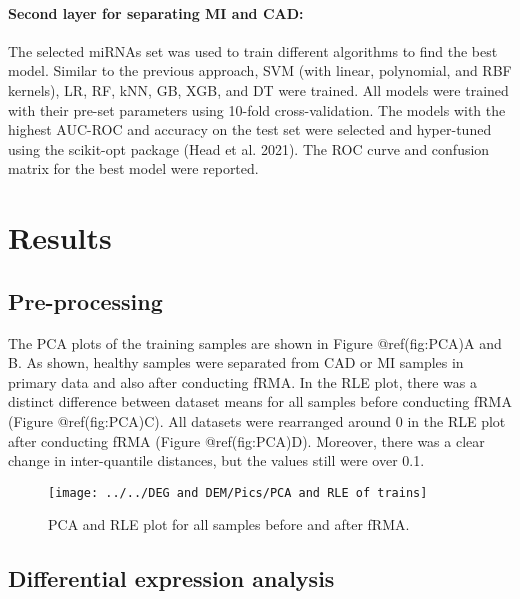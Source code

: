 \documentclass[smallextended]{svjour3}       %
\begin{document}
\hypertarget{second-layer-for-separating-mi-and-cad}{%
\paragraph{Second layer for separating MI and
CAD:}\label{second-layer-for-separating-mi-and-cad}}

The selected miRNAs set was used to train different algorithms to find
the best model. Similar to the previous approach, SVM (with linear,
polynomial, and RBF kernels), LR, RF, kNN, GB, XGB, and DT were trained.
All models were trained with their pre-set parameters using 10-fold
cross-validation. The models with the highest AUC-ROC and accuracy on
the test set were selected and hyper-tuned using the scikit-opt package
(Head et al. 2021). The ROC curve and confusion matrix for the best
model were reported.

\hypertarget{results}{%
\section{Results}\label{results}}

\hypertarget{pre-processing-1}{%
\subsection{Pre-processing}\label{pre-processing-1}}

The PCA plots of the training samples are shown in Figure @ref(fig:PCA)A
and B. As shown, healthy samples were separated from CAD or MI samples
in primary data and also after conducting fRMA. In the RLE plot, there
was a distinct difference between dataset means for all samples before
conducting fRMA (Figure @ref(fig:PCA)C). All datasets were rearranged
around 0 in the RLE plot after conducting fRMA (Figure @ref(fig:PCA)D).
Moreover, there was a clear change in inter-quantile distances, but the
values still were over 0.1.

\begin{figure}
\texttt{[image: ../../DEG and DEM/Pics/PCA and RLE of trains]} \caption{PCA and RLE plot for all samples before and after fRMA.}\label{fig:PCA}
\end{figure}

\hypertarget{differential-expression-analysis-1}{%
\subsection{Differential expression
analysis}\label{differential-expression-analysis-1}}
\end{document}
